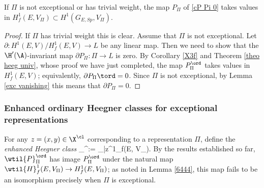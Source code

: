 \begin{prop}
\notready{}  If $\Pi$ is not exceptional or has trivial weight,  the map $P_{\Pi}$ of \eqref{cP Pi 0} takes values in $H^{1}_{f}(E, V_{\Pi})\subset H^{1}(G_{E, Sp},V_{\Pi})$.
\end{prop}
\begin{proof} If $\Pi$ has trivial weight this is clear. Assume  that $\Pi$ is not exceptional.
 Let $\partial\colon H^{1}(E, V)/H^{1}_{f}(E , V)\to L$ be any linear map. Then we need to show that the $\H'(\A)$-invariant map $\partial P_{\Pi}\colon \Pi \to L$ is zero.
By Corollary \ref{X3f} and  Theorem \ref{theo heeg univ}, whose proof we have just completed,  the map $P_{\Pi}^{\ord}$ takes values in $H^{1}_{f}(E, V)$; equivalently, $\partial  P_{\Pi}\tord =0$. Since $\Pi$ is not exceptional,  by Lemma \ref{exc vanishing} this means that $\partial  P_{\Pi}=0$.
\end{proof}

\subsubsection{Enhanced ordinary Heegner classes for exceptional representations}
For any $z=(x, y)\in \X^{\cl}$ corresponding to a representation $\Pi$, define the \emph{enhanced Heegner class}
\beq {} _{\Pi}^{\ord}:= \cP_{|z}\in {}^{1}_{f}(E, V_{\Pi}). \eeq
By the results established so far,  $ \wtil{P}_{\Pi}^{\ord}$ has image $P_{\Pi}^{\ord}$ under the natural map $ \wtil{H}^{1}_{f}(E, V_{\Pi})\to {H}^{1}_{f}(E, V_{\Pi})$; as  noted in Lemma \ref{6444}, this map fails to be an isomorphism precisely when $\Pi $ is exceptional.
